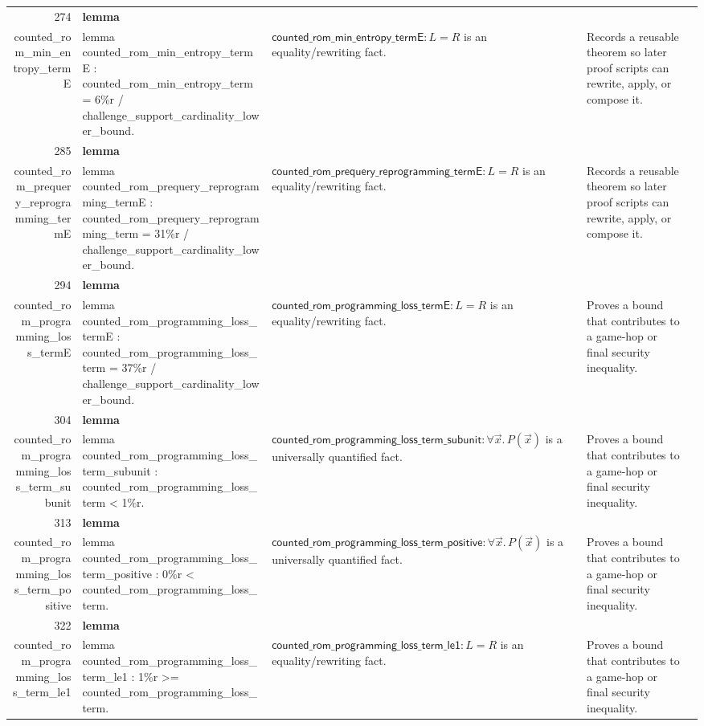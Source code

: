 \documentclass[10pt]{article}
\newcommand{\ec}[1]{\begingroup\ttfamily\scriptsize #1\endgroup}
\begin{document}
\begin{longtable}{r L{0.17\textwidth} L{0.26\textwidth} L{0.27\textwidth} L{0.20\textwidth}}
274 & \textbf{lemma}\\\ec{counted\_rom\_min\_entropy\_termE} & \ec{lemma counted\_rom\_min\_entropy\_termE : counted\_rom\_min\_entropy\_term = 6\%r / challenge\_support\_cardinality\_lower\_bound.} & \(\mathsf{counted\_rom\_min\_entropy\_termE} : L = R\) is an equality/rewriting fact. & Records a reusable theorem so later proof scripts can rewrite, apply, or compose it. \\
285 & \textbf{lemma}\\\ec{counted\_rom\_prequery\_reprogramming\_termE} & \ec{lemma counted\_rom\_prequery\_reprogramming\_termE : counted\_rom\_prequery\_reprogramming\_term = 31\%r / challenge\_support\_cardinality\_lower\_bound.} & \(\mathsf{counted\_rom\_prequery\_reprogramming\_termE} : L = R\) is an equality/rewriting fact. & Records a reusable theorem so later proof scripts can rewrite, apply, or compose it. \\
294 & \textbf{lemma}\\\ec{counted\_rom\_programming\_loss\_termE} & \ec{lemma counted\_rom\_programming\_loss\_termE : counted\_rom\_programming\_loss\_term = 37\%r / challenge\_support\_cardinality\_lower\_bound.} & \(\mathsf{counted\_rom\_programming\_loss\_termE} : L = R\) is an equality/rewriting fact. & Proves a bound that contributes to a game-hop or final security inequality. \\
304 & \textbf{lemma}\\\ec{counted\_rom\_programming\_loss\_term\_subunit} & \ec{lemma counted\_rom\_programming\_loss\_term\_subunit : counted\_rom\_programming\_loss\_term < 1\%r.} & \(\mathsf{counted\_rom\_programming\_loss\_term\_subunit} : \forall \vec{x}.\, P(\vec{x})\) is a universally quantified fact. & Proves a bound that contributes to a game-hop or final security inequality. \\
313 & \textbf{lemma}\\\ec{counted\_rom\_programming\_loss\_term\_positive} & \ec{lemma counted\_rom\_programming\_loss\_term\_positive : 0\%r < counted\_rom\_programming\_loss\_term.} & \(\mathsf{counted\_rom\_programming\_loss\_term\_positive} : \forall \vec{x}.\, P(\vec{x})\) is a universally quantified fact. & Proves a bound that contributes to a game-hop or final security inequality. \\
322 & \textbf{lemma}\\\ec{counted\_rom\_programming\_loss\_term\_le1} & \ec{lemma counted\_rom\_programming\_loss\_term\_le1 : 1\%r >= counted\_rom\_programming\_loss\_term.} & \(\mathsf{counted\_rom\_programming\_loss\_term\_le1} : L = R\) is an equality/rewriting fact. & Proves a bound that contributes to a game-hop or final security inequality. \\

\end{longtable}
\end{document}
